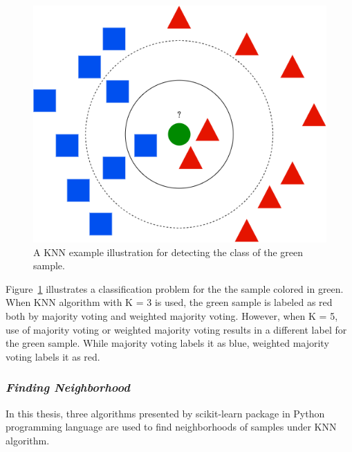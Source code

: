 \begin{figure}[h]
	\centering
	\includegraphics[width=.6\linewidth]{fig/knnExample.png}
	\vspace*{2mm}
	\caption{A KNN example illustration for detecting the class of the green sample.}
	\label{fig:knn_example}
\end{figure}

Figure~\ref{fig:knn_example} illustrates a classification problem for the the sample colored in green. When KNN algorithm with K = 3 is used, the green sample is labeled as red both by majority voting and weighted majority voting. However, when K = 5, use of majority voting or weighted majority voting results in a different label for the green sample. While majority voting labels it as blue,
weighted majority voting labels it as red.

\subsubsection*{\textit{Finding Neighborhood}}

In this thesis, three algorithms presented by scikit-learn
package \cite{scikit-learn} in Python programming language are used to find neighborhoods of samples under KNN algorithm.

